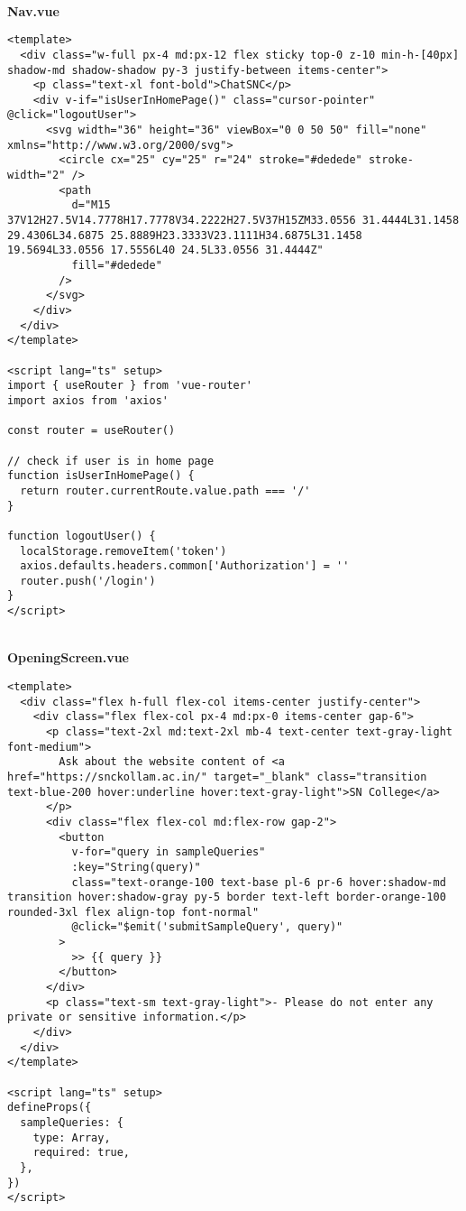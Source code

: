 \
\\
\textbf{Nav.vue}

\begin{Verbatim}[breaklines=true, breakanywhere=true]
<template>
  <div class="w-full px-4 md:px-12 flex sticky top-0 z-10 min-h-[40px] shadow-md shadow-shadow py-3 justify-between items-center">
    <p class="text-xl font-bold">ChatSNC</p>
    <div v-if="isUserInHomePage()" class="cursor-pointer" @click="logoutUser">
      <svg width="36" height="36" viewBox="0 0 50 50" fill="none" xmlns="http://www.w3.org/2000/svg">
        <circle cx="25" cy="25" r="24" stroke="#dedede" stroke-width="2" />
        <path
          d="M15 37V12H27.5V14.7778H17.7778V34.2222H27.5V37H15ZM33.0556 31.4444L31.1458 29.4306L34.6875 25.8889H23.3333V23.1111H34.6875L31.1458 19.5694L33.0556 17.5556L40 24.5L33.0556 31.4444Z"
          fill="#dedede"
        />
      </svg>
    </div>
  </div>
</template>

<script lang="ts" setup>
import { useRouter } from 'vue-router'
import axios from 'axios'

const router = useRouter()

// check if user is in home page
function isUserInHomePage() {
  return router.currentRoute.value.path === '/'
}

function logoutUser() {
  localStorage.removeItem('token')
  axios.defaults.headers.common['Authorization'] = ''
  router.push('/login')
}
</script>

\end{Verbatim}
\
\\
\textbf{OpeningScreen.vue}

\begin{Verbatim}[breaklines=true, breakanywhere=true]
<template>
  <div class="flex h-full flex-col items-center justify-center">
    <div class="flex flex-col px-4 md:px-0 items-center gap-6">
      <p class="text-2xl md:text-2xl mb-4 text-center text-gray-light font-medium">
        Ask about the website content of <a href="https://snckollam.ac.in/" target="_blank" class="transition text-blue-200 hover:underline hover:text-gray-light">SN College</a>
      </p>
      <div class="flex flex-col md:flex-row gap-2">
        <button
          v-for="query in sampleQueries"
          :key="String(query)"
          class="text-orange-100 text-base pl-6 pr-6 hover:shadow-md transition hover:shadow-gray py-5 border text-left border-orange-100 rounded-3xl flex align-top font-normal"
          @click="$emit('submitSampleQuery', query)"
        >
          >> {{ query }}
        </button>
      </div>
      <p class="text-sm text-gray-light">- Please do not enter any private or sensitive information.</p>
    </div>
  </div>
</template>

<script lang="ts" setup>
defineProps({
  sampleQueries: {
    type: Array,
    required: true,
  },
})
</script>

\end{Verbatim}

